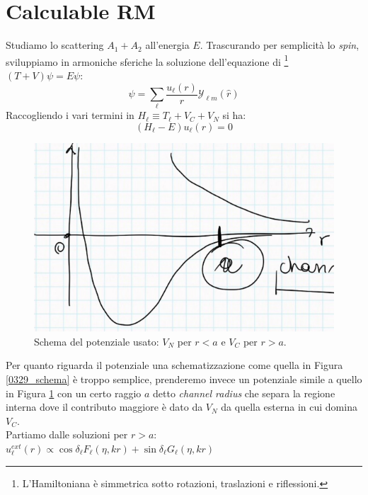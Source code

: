 \section{Calculable RM}\label{sec-RM-C}
Studiamo lo scattering $A_1 + A_2$ all'energia $E$. Trascurando per semplicità lo \textit{spin}, sviluppiamo in armoniche sferiche la soluzione dell'equazione di \Sch{}\footnote{L'Hamiltoniana è simmetrica sotto rotazioni, traslazioni e riflessioni.} $(T+V)\psi = E\psi$:
$$\psi = \sum_\ell \frac{u_\ell (r)}{r}\mathcal{Y}_{\ell m}(\hat{r})$$
Raccogliendo i vari termini in $H_\ell\equiv T_\ell + V_C + V_N$ si ha:
\begin{equation}\label{0412_sch}
	(H_\ell - E) u_\ell (r) =0
\end{equation}
\begin{figure}[h]
	\centering
	\includegraphics[scale=0.5]{Immagini/0412_potschem.png}
	\caption{Schema del potenziale usato: $V_N$ per $r<a$ e $V_C$ per $r>a$.}
	\label{0412_pot}
\end{figure}
\newline
\noindent Per quanto riguarda il potenziale una schematizzazione come quella in Figura \ref{0329_schema} è troppo semplice, prenderemo invece un potenziale simile a quello in Figura \ref{0412_pot} con un certo raggio $a$ detto \textit{channel radius} che separa la regione interna dove il contributo maggiore è dato da $V_N$ da quella esterna in cui domina $V_C$.\\ 
Partiamo dalle soluzioni per $r>a$:
$u_\ell^{ext} (r) \propto \cos{\delta_\ell} F_\ell (\eta, kr) + \sin{\delta_\ell}G_\ell (\eta,kr)$
